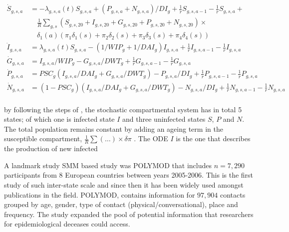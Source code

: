 \documentclass[12pt]{article}
\begin{document}
\begin{align*}
\dot{S}_{g,s,a} & =  -\lambda_{g,s,a}(t)S_{g,s,a} + (P_{g,s,a} + N_{g,s,a})/DI_g + \frac{1}{r}S_{g,s,a-1} - \frac{1}{r}S_{g,s,a} + \\
& \quad \frac{1}{R}\sum_{g,s}(S_{g,s,20} + I_{g,s,20} + G_{g,s,20} + P_{g,s,20} + N_{g,s,20}) \times \\
& \quad \delta_1(a)(\pi_1\delta_1(s) + \pi_2\delta_2(s) + \pi_3\delta_3(s) + \pi_4\delta_4(s)) \\ 
\dot{I}_{g,s,a}  & =  \lambda_{g,s,a}(t)S_{g,s,a} - (1/WIP_g + 1/DAI_g)I_{g,s,a} + \frac{1}{r}I_{g,s,a-1}-\frac{1}{r}I_{g,s,a} \\
\dot{G}_{g,s,a}  & =  I_{g,s,a}/WIP_g - G_{g,s,a}/DWT_g + \frac{1}{r}G_{g,s,a-1} - \frac{1}{r}G_{g,s,a} \\ 
\dot{P}_{g,s,a}  & =  PSC_g(I_{g,s,a}/DAI_g + G_{g,s,a}/DWT_g) - P_{g,s,a}/DI_g + \frac{1}{r}P_{g,s,a-1} - \frac{1}{r}P_{g,s,a} \\
\dot{N}_{g,s,a}  & =  (1-PSC_g)(I_{g,s,a}/DAI_g + G_{g,s,a}/DWT_g) - N_{g,s,a}/DI_g + \frac{1}{r}N_{g,s,a-1}-\frac{1}{r}N_{g,s,a} \\
\end{align*}

by following the steps of \cite[p.875]{Diekmann:2010}, the stochastic compartmental system has in total 5 states; of which one is infected state $I$ and three uninfected states $S$, $P$ and $N$. The total population remains constant by adding an ageing term in the susceptible compartment, $\frac{1}{R}\sum(\dots)\times\delta\pi$ \cite[p.7]{Gareth:2013}. The ODE $I$ is the one that describes the production of new infected

A landmark study SMM based study was POLYMOD \cite{Mossong:2008} that includes $n=7,290$ participants from 8 European countries between years 2005-2006. This is the first study of such inter-state scale and since then it has been widely used amongst publications in the field. POLYMOD, contains information for $97,904$ contacts grouped by age, gender, type of contact (physical/conversational), place and frequency. The study expanded the pool of potential information that researchers for epidemiological deceases could access.
\end{document}
